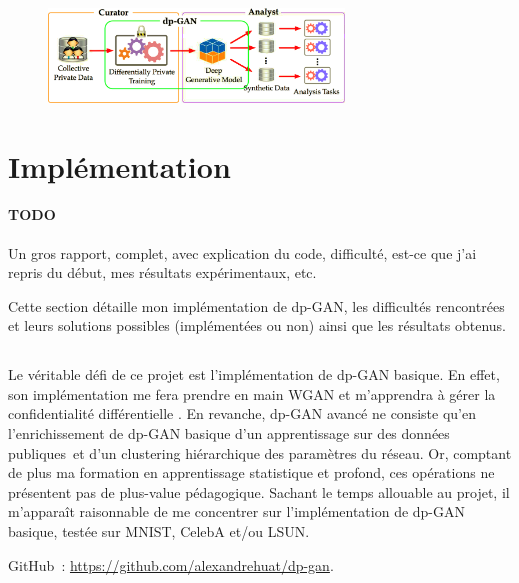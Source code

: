 \documentclass[a4paper,11pt]{article}
\theoremstyle{definition}
\newcommand{\TODO}[1]{{\color{orange}\sffamily\paragraph{\sffamily TODO} #1\\}}
\begin{document}
\begin{figure}
    \centering
    \includegraphics[width=0.7\textwidth]{dp-gan_role.png}
    \label{dp-gan_role}
\end{figure}

\section{Implémentation}

\TODO{Un gros rapport, complet, avec explication du code, difficulté, est-ce que j'ai repris du début, mes résultats expérimentaux, etc.}

Cette section détaille mon implémentation de dp-GAN, les difficultés rencontrées et leurs solutions possibles (implémentées ou non) ainsi que les résultats obtenus.

\subsection{}

Le véritable défi de ce projet est l'implémentation de dp-GAN basique. En effet, son implémentation me fera prendre en main WGAN et m'apprendra à gérer la confidentialité différentielle \citep{dlwdp, pinq}. En revanche, dp-GAN avancé ne consiste qu'en l'enrichissement de dp-GAN basique d'un apprentissage sur des données publiques et d'un clustering hiérarchique des paramètres du réseau. Or, comptant de plus ma formation en apprentissage statistique et profond, ces opérations ne présentent pas de plus-value pédagogique. Sachant le temps allouable au projet, il m'apparaît raisonnable de me concentrer sur l'implémentation de dp-GAN basique, testée sur MNIST, CelebA et/ou LSUN.

GitHub : \url{https://github.com/alexandrehuat/dp-gan}.

\printbibliography[title=Références,heading=bibintoc]
\end{document}
